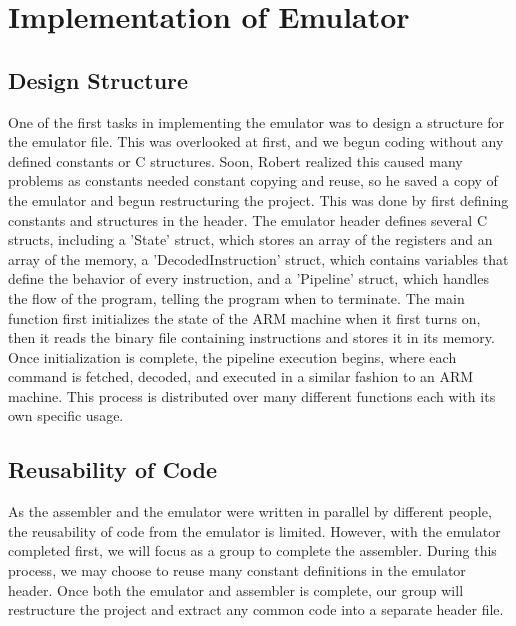 \documentclass[11pt]{article}
\begin{document}
\section{Implementation of Emulator}

\subsection{Design Structure}
One of the first tasks in implementing the emulator was to design a structure for the emulator file. This was overlooked at first, and we begun coding without any defined constants or C structures. Soon, Robert realized this caused many problems as constants needed constant copying and reuse, so he saved a copy of the emulator and begun restructuring the project. This was done by first defining constants and structures in the header. The emulator header defines several C structs, including a 'State' struct, which stores an array of the registers and an array of the memory, a 'DecodedInstruction' struct, which contains variables that define the behavior of every instruction, and a 'Pipeline' struct, which handles the flow of the program, telling the program when to terminate. The main function first initializes the state of the ARM machine when it first turns on, then it reads the binary file containing instructions and stores it in its memory. Once initialization is complete, the pipeline execution begins, where each command is fetched, decoded, and executed in a similar fashion to an ARM machine. This process is distributed over many different functions each with its own specific usage.

\subsection{Reusability of Code}
As the assembler and the emulator were written in parallel by different people, the reusability of code from the emulator is limited. However, with the emulator completed first, we will focus as a group to complete the assembler. During this process, we may choose to reuse many constant definitions in the emulator header. Once both the emulator and assembler is complete, our group will restructure the project and extract any common code into a separate header file.
\end{document}
